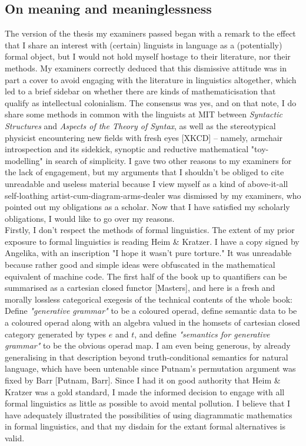 \subsection{On meaning and meaninglessness}

The version of the thesis my examiners passed began with a remark to the effect that I share an interest with (certain) linguists in language as a (potentially) formal object, but I would not hold myself hostage to their literature, nor their methods. My examiners correctly deduced that this dismissive attitude was in part a cover to avoid engaging with the literature in linguistics altogether, which led to a brief sidebar on whether there are kinds of mathematicisation that qualify as intellectual colonialism. The consensus was yes, and on that note, I do share some methods in common with the linguists at MIT between \emph{Syntactic Structures} and \emph{Aspects of the Theory of Syntax}, as well as the stereotypical physicist encountering new fields with fresh eyes [XKCD] -- namely, armchair introspection and its sidekick, synoptic and reductive mathematical "toy-modelling" in search of simplicity. I gave two other reasons to my examiners for the lack of engagement, but my arguments that I shouldn't be obliged to cite unreadable and useless material because I view myself as a kind of above-it-all self-loathing artist-cum-diagram-arms-dealer was dismissed by my examiners, who pointed out my obligations as a scholar. Now that I have satisfied my scholarly obligations, I would like to go over my reasons.\\

Firstly, I don't respect the methods of formal linguistics. The extent of my prior exposure to formal linguistics is reading Heim \& Kratzer. I have a copy signed by Angelika, with an inscription "I hope it wasn't pure torture." It was unreadable because rather good and simple ideas were obfuscated in the mathematical equivalent of machine code. The first half of the book up to quantifiers can be summarised as a cartesian closed functor [Masters], and here is a fresh and morally lossless categorical exegesis of the technical contents of the whole book: Define \emph{"generative grammar"} to be a coloured operad, define semantic data to be a coloured operad along with an algebra valued in the homsets of cartesian closed category generated by types $e$ and $t$, and define \emph{"semantics for generative grammar"} to be the obvious operad map. I am even being generous, by already generalising in that description beyond truth-conditional semantics for natural language, which have been untenable since Putnam's permutation argument was fixed by Barr [Putnam, Barr]. Since I had it on good authority that Heim \& Kratzer was a gold standard, I made the informed decision to engage with all formal linguistics as little as possible to avoid mental pollution. I believe that I have adequately illustrated the possibilities of using diagrammatic mathematics in formal linguistics, and that my disdain for the extant formal alternatives is valid.\\

